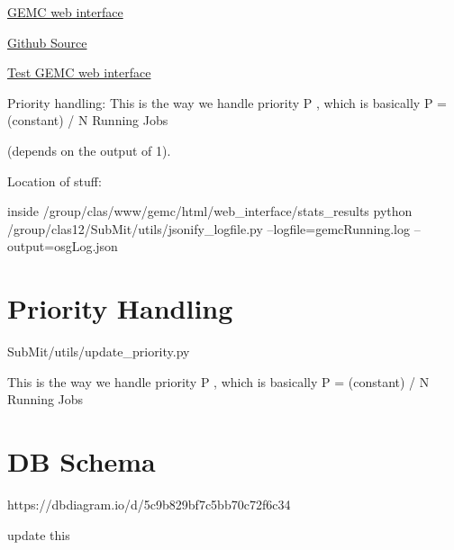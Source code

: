 

\href{https://gemc.jlab.org/web_interface/index.php}{GEMC web interface}

\href{https://github.com/mit-mc-clas12}{Github Source}

\href{https://gemc.jlab.org/test/web_interface/index.php}{Test GEMC web interface}


Priority handling:  This is the way we handle priority P , which is basically P =  (constant) / N Running Jobs

   (depends on the output of 1).
   
   
 
Location of stuff:

       inside /group/clas/www/gemc/html/web_interface/stats_results
       python /group/clas12/SubMit/utils/jsonify_logfile.py --logfile=gemcRunning.log --output=osgLog.json


\section{Priority Handling}


       SubMit/utils/update\_priority.py
    
       This is the way we handle priority P , which is basically P =  (constant) / N Running Jobs
    
    


\section{DB Schema}
https://dbdiagram.io/d/5c9b829bf7c5bb70c72f6c34

update this